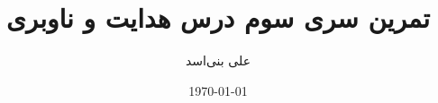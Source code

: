 \documentclass[12pt,onecolumn,a4paper]{article}
\begin{document}
	\title{تمرین سری سوم درس هدایت و ناوبری} 
	\author{علی بنی‌اسد}
	\date{\today}
	\maketitle
	
	
	
	
	
	
	
	
	\newpage
	\tableofcontents
	\listoffigures
	\listoftables
\end{document}
